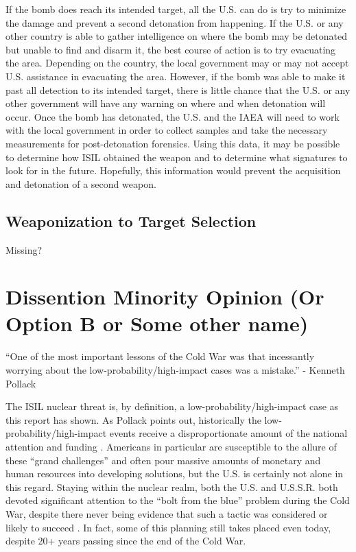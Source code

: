 \documentclass{report}
\begin{document}
If the bomb does reach its intended target, all the U.S. can do is try to minimize the damage and prevent a second detonation from happening.  If the U.S. or any other country is able to gather intelligence on where the bomb may be detonated but unable to find and disarm it, the best course of action is to try evacuating the area.  Depending on the country, the local government may or may not accept U.S. assistance in evacuating the area.  However, if the bomb was able to make it past all detection to its intended target, there is little chance that the U.S. or any other government will have any warning on where and when detonation will occur.  Once the bomb has detonated, the U.S. and the IAEA will need to work with the local government in order to collect samples and take the necessary measurements for post-detonation forensics.  Using this data, it may be possible to determine how ISIL obtained the weapon and to determine what signatures to look for in the future.  Hopefully, this information would prevent the acquisition and detonation of a second weapon.



\section{Weaponization to Target Selection}


Missing?




\chapter{Dissention Minority Opinion (Or Option B or Some other name)}


\begin{center}
 \enquote{One of the most important lessons of the Cold War was that incessantly worrying about the low-probability/high-impact cases was a mistake.}  - Kenneth Pollack \cite{pollack2014unthinkable}
\end{center}


The ISIL nuclear threat is, by definition, a low-probability/high-impact case as this report has shown. As Pollack points out, historically the low-probability/high-impact events receive a disproportionate amount of the national attention and funding \cite{pollack2014unthinkable}. Americans in particular are susceptible to the allure of these \enquote{grand challenges} and often pour massive amounts of monetary and human resources into developing solutions, but the U.S. is certainly not alone in this regard. Staying within the nuclear realm, both the U.S. and U.S.S.R. both devoted significant attention to the \enquote{bolt from the blue} problem during the Cold War, despite there never being evidence that such a tactic was considered or likely to succeed \cite{pollack2014unthinkable,Bracken2013}.  In fact, some of this planning still takes placed even today, despite 20+ years passing since the end of the Cold War.
\end{document}
